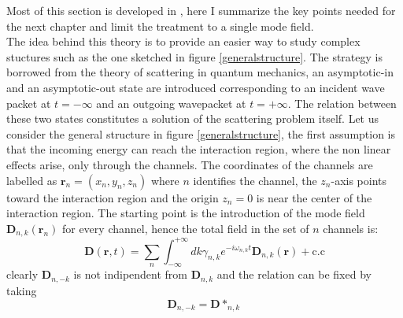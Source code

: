 \documentclass[12pt]{book}
\renewcommand{\r}{\mathbf{r}}
\begin{document}
Most of this section is developed in \cite{Liscidini2012}, here I summarize the key points needed for the next chapter and limit the treatment to a single mode field.\\ The idea behind this theory is to provide an easier way to study complex stuctures such as the one sketched in figure \ref{generalstructure}. The strategy is borrowed from the theory of scattering in quantum mechanics, an asymptotic-in and an asymptotic-out state are introduced corresponding to an incident wave packet at $t = -\infty$ and an outgoing wavepacket at $t = +\infty$. The relation between these two states constitutes a solution of the scattering problem itself. Let us consider the general structure in figure \ref{generalstructure}, the first assumption is that the incoming energy can reach the interaction region, where the non linear effects arise, only through the channels. The coordinates of the channels are labelled as $\r_n = (x_n,y_n,z_n)$ where $n$ identifies the channel, the $z_n$-axis points toward the interaction region and the origin $z_n = 0$ is near the center of the interaction region. The starting point is the introduction of the mode field $\mathbf{D}_{n,k}(\r_n)$ for every channel, hence the total field in the set of $n$ channels is:
\begin{equation}\mathbf{D}(\r,t) = \sum_n\int_{-\infty}^{+\infty}dk \gamma_{n,k} e^{-i\omega_{n,k}t}\mathbf{D}_{n,k}(\r)  + \text{c.c}\end{equation}
clearly $\mathbf{D}_{n,-k}$ is not indipendent from $\mathbf{D}_{n,k}$ and the relation can be fixed by taking
\begin{equation}\label{ddstar}\mathbf{D}_{n,-k} = \mathbf{D}*_{n,k}\end{equation}
\end{document}
